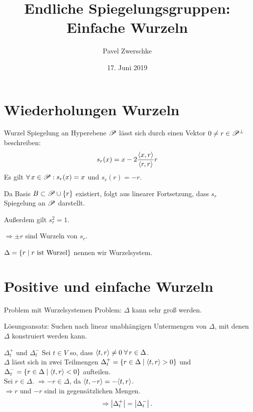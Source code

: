 \documentclass[18pt]{beamer}
\title[Einfache Wurzeln]{Endliche Spiegelungsgruppen:\\
Einfache Wurzeln}
\author{Pavel Zwerschke}
\date{17. Juni 2019}
\begin{document}
\begin{frame}
    \maketitle
\end{frame}

\begin{frame}
    \tableofcontents
\end{frame}

\section{Wiederholungen Wurzeln}

\begin{frame}{Wurzel}
    Spiegelung an Hyperebene \( \mathscr{P} \) 
    lässt sich durch einen Vektor
    \( 0 \neq r \in \mathscr{P}^{\bot} \)
    beschreiben:
    \[ s_r(x) = x 
    - 2\frac{\langle x, r \rangle}{\langle r, r \rangle} r \]
    Es gilt \( \forall x \in \scrP: s_r(x) = x \) 
    und \( s_r(r) = -r \).

    Da Basis \( B \subset \mathscr{P} \cup \{r\} \) 
    existiert, folgt aus linearer Fortsetzung, dass 
    \( s_r \) Spiegelung an \( \mathscr{P} \) darstellt.

    Außerdem gilt \( s_r^2 = 1 \).

    \( \Rightarrow \pm r \) sind Wurzeln von \( s_r \).

    \( \Delta = \{ r \;\vert\; r \text{ ist Wurzel} \} \) 
    nennen wir Wurzelsystem.
\end{frame}
\section{Positive und einfache Wurzeln}
\begin{frame}{Problem mit Wurzelsystemen}
    Problem: \( \Delta \) kann sehr groß werden.

    Lösungsansatz: Suchen nach linear unabhängigen 
    Untermengen von \( \Delta \), mit denen \( \Delta \)
    konstruiert werden kann.
\end{frame}

\begin{frame}{\( \Delta_t^+ \) und \( \Delta_t^- \)}
    Sei \( t \in V \) so, dass \( \scalarprod{t}{r} \neq 0 
    \; \forall r \in \Delta \).\\
    \( \Delta \) lässt sich in zwei Teilmengen 
    \( \Delta_t^+ = 
    \{r \in \Delta \;\vert \; \langle t, r \rangle > 0\} \) 
    und \( \Delta_t^- = 
    \{r \in \Delta \;\vert \; \langle t, r \rangle < 0\} \) 
    aufteilen.\\
    Sei \( r \in \Delta \). \( \Rightarrow -r \in \Delta \), 
    da \( \langle t, -r \rangle = -\langle t, r \rangle \).\\
    \( \Rightarrow r \) und \( -r \) sind in 
    gegensätzlichen Mengen.
    \[ \Rightarrow \left|\Delta_t^+\right| = \left|\Delta_t^-\right|. \]
\end{frame}
\end{document}
